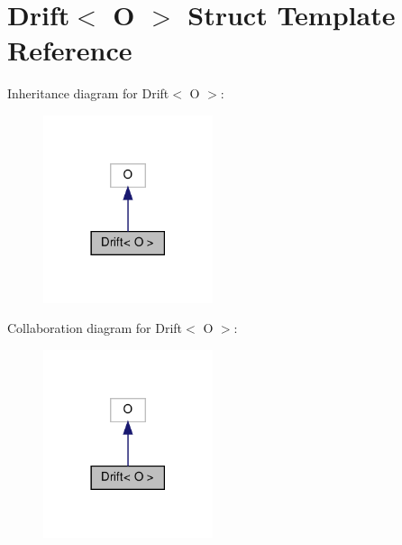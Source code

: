 \hypertarget{structDrift}{}\section{Drift$<$ O $>$ Struct Template Reference}
\label{structDrift}


Inheritance diagram for Drift$<$ O $>$\+:\nopagebreak
\begin{figure}[H]
\begin{center}
\leavevmode
\includegraphics[width=141pt]{structDrift__inherit__graph}
\end{center}
\end{figure}


Collaboration diagram for Drift$<$ O $>$\+:\nopagebreak
\begin{figure}[H]
\begin{center}
\leavevmode
\includegraphics[width=141pt]{structDrift__coll__graph}
\end{center}
\end{figure}
